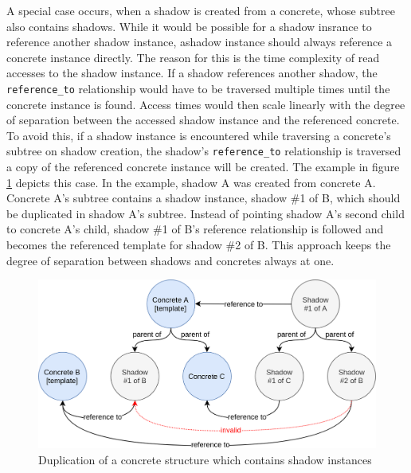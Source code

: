 \documentclass[a4paper,11pt]{article}
\def\inline{\lstinline[basicstyle=\ttfamily,keywordstyle={}]}
\begin{document}
                    A special case occurs, when a shadow is created from
                    a concrete, whose subtree also contains shadows.
                    While it would be possible for a shadow insrance to reference another
                    shadow instance, ashadow instance should always reference a concrete
                    instance directly. The reason for this is the time complexity
                    of read accesses to the shadow instance. If a shadow references
                    another shadow, the \inline{reference_to} relationship would
                    have to be traversed multiple times until the concrete instance
                    is found. Access times would then scale linearly with
                    the degree of separation between the accessed shadow instance
                    and the referenced concrete. To avoid this, if a shadow
                    instance is encountered while traversing a concrete's
                    subtree on shadow creation, the shadow's \inline{reference_to}
                    relationship is traversed a copy of the referenced concrete
                    instance will be created. The example in figure \ref{fig:template-contains-copies}
                    depicts this case. In the example, shadow A was created from
                    concrete A. Concrete A's subtree contains a shadow instance,
                    shadow \#1 of B, which should be duplicated in shadow A's subtree.
                    Instead of pointing shadow A's second child to concrete A's child,
                    shadow \#1 of B's reference relationship is followed and becomes
                    the referenced template for shadow \#2 of B.
                    This approach keeps the degree of separation between shadows
                    and concretes always at one.

                    \begin{figure}[H]
                        \centering
                        \includegraphics[width=.9\textwidth]{template-contains-copies}
                        \caption{Duplication of a concrete structure which contains shadow instances}
                        \label{fig:template-contains-copies}
                    \end{figure}
\end{document}
